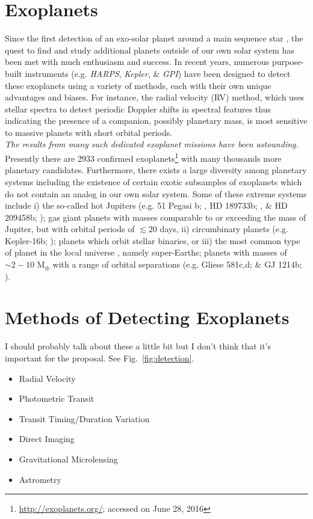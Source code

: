 \section{Exoplanets} \label{sect:exoplanets}
Since the first detection of an exo-solar planet around a main sequence star 
\parencite{mayor95}, 
the quest to find and study additional planets outside of our own solar system 
has been met with much enthusiasm and success. In recent years, numerous 
purpose-built instruments (e.g. \emph{HARPS}, 
\emph{Kepler}, \& \emph{GPI}) 
have been designed 
to detect these exoplanets using a variety of methods, each with their own 
unique advantages and biases. 
For instance, the radial velocity (RV) method, which uses stellar spectra to 
detect periodic Doppler 
shifts in spectral features thus indicating the presence of 
a companion, possibly planetary mass, is most sensitive to massive planets 
with short orbital periods.  \\

\emph{The results from many such dedicated exoplanet missions have been 
astounding.} Presently there are 2933 confirmed 
exoplanets\footnote{\url{http://exoplanets.org/}; accessed on June 28, 2016} 
with many thousands more planetary candidates. Furthermore, there 
exists a large diversity among planetary systems including the existence 
of certain exotic subsamples of exoplanets which do not contain an analog in 
our own solar system. Some of these extreme systems include i) the so-called hot 
Jupiters (e.g. 51 Pegasi b; \cite{mayor95}, HD 189733b; \cite{bouchy05}, 
\& HD 209458b; \cite{mazeh99, charbonneau00}); 
gas giant planets with masses comparable to or exceeding the mass of Jupiter, 
but with orbital periods of $\lesssim 20$ days, ii) circumbinary planets (e.g. 
Kepler-16b; \cite{doyle11}); 
planets which orbit stellar binaries, or iii) the most common type of 
planet in the local universe \parencite{petigura13}, 
namely super-Earths; planets with masses of 
$\sim 2-10$ M$_{\oplus}$ with a range of orbital separations (e.g. 
Gliese 581c,d; \cite{udry07} \& GJ 1214b; \cite{charbonneau09}).

\section{Methods of Detecting Exoplanets} \label{sect:detection}
I should probably talk about these a little bit but I don't think that it's 
important for the proposal. See Fig.~\ref{fig:detection}.
\begin{itemize}
\item Radial Velocity
\item Photometric Transit
\item Transit Timing/Duration Variation
\item Direct Imaging
\item Gravitational Microlensing
\item Astrometry
\end{itemize}

